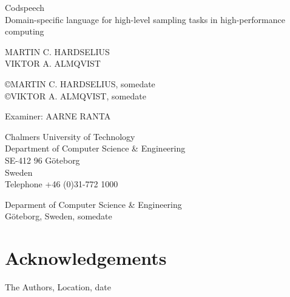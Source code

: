 \begin{flushleft}
Codspeech\\
Domain-specific language for high-level sampling tasks in
high-performance computing
\vspace{11pt}

MARTIN C. HARDSELIUS\\
VIKTOR A. ALMQVIST
\vspace{11pt}

\copyright{MARTIN C. HARDSELIUS}, somedate \\
\copyright{VIKTOR A. ALMQVIST}, somedate
\vspace{11pt}

Examiner: {AARNE RANTA}
\vspace{11pt}

Chalmers University of Technology\\
Department of Computer Science \& Engineering\\
SE-412 96 Göteborg\\
Sweden\\
Telephone +46 (0)31-772 1000
\vspace{66pt}

Deparment of Computer Science \& Engineering\\
Göteborg, Sweden, somedate
\end{flushleft}

\newpage
\clearpage
\thispagestyle{empty}

\begin{abstract}
\lipsum[1]
\end{abstract}

\newpage
\clearpage
\mbox{}
\newpage
\clearpage
\thispagestyle{empty}
\section*{Acknowledgements}
\lipsum[1]

\hfill The Authors, Location, date
\newpage
\clearpage
\mbox{}
